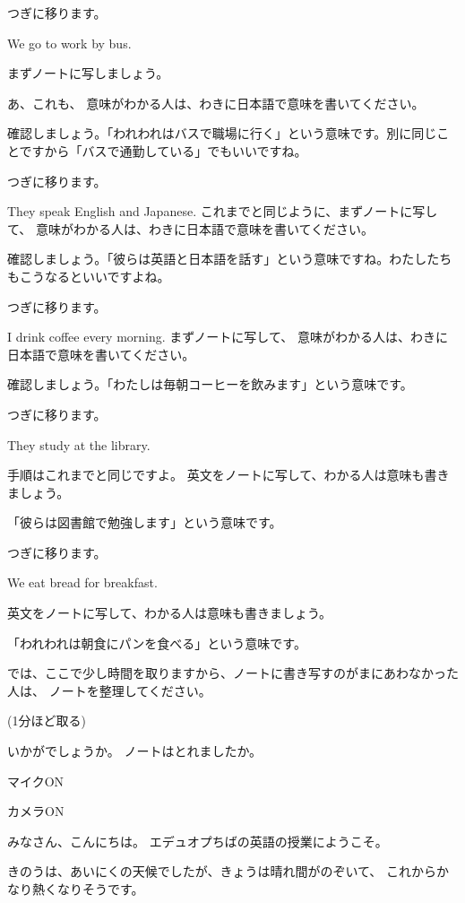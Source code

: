\documentclass[book,jafontscale=0.9247]{jlreq}
\newenvironment{my_check}
  {\begin{itemize}
    \renewcommand\labelitemi{$\square\hspace{0.5em}$}} %
  {\end{itemize}}
\begin{document}
つぎに移ります。{\large \ComputerMouse}

We  go to work by bus.

まずノートに写しましょう。

あ、これも、
意味がわかる人は、わきに日本語で意味を書いてください。

{\large \ComputerMouse}確認しましょう。「われわれはバスで職場に行く」という意味です。別に同じことですから「バスで通勤している」でもいいですね。

つぎに移ります。

They speak English and Japanese.
これまでと同じように、まずノートに写して、
意味がわかる人は、わきに日本語で意味を書いてください。

確認しましょう。「彼らは英語と日本語を話す」という意味ですね。わたしたちもこうなるといいですよね。

つぎに移ります。

I drink coffee every morning.
まずノートに写して、
意味がわかる人は、わきに日本語で意味を書いてください。

確認しましょう。「わたしは毎朝コーヒーを飲みます」という意味です。

つぎに移ります。

They study at the library. 

手順はこれまでと同じですよ。
英文をノートに写して、わかる人は意味も書きましょう。

「彼らは図書館で勉強します」という意味です。

つぎに移ります。

We eat bread for breakfast.

英文をノートに写して、わかる人は意味も書きましょう。

「われわれは朝食にパンを食べる」という意味です。


では、ここで少し時間を取りますから、ノートに書き写すのがまにあわなかった人は、
ノートを整理してください。



(1分ほど取る)

いかがでしょうか。
ノートはとれましたか。
\newpage
\begin{my_check}
\item マイクON
\item カメラON
\end{my_check}

{\LARGE \ComputerMouse}

みなさん、こんにちは。
エデュオプちばの英語の授業にようこそ。

きのうは、あいにくの天候でしたが、きょうは晴れ間がのぞいて、
これからかなり熱くなりそうです。
\end{document}

